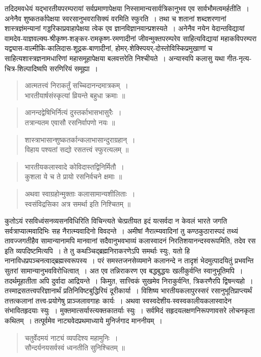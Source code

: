 {\dev तदिदमवधेयं यद्भारतीयपरम्परायां सर्वप्रमाणापेक्षया निस्सामान्यसार्वत्रिकानुभव एव सार्व\-भौमत्वमर्हतीति~। अनेनैव शुष्कतर्कापेक्षया स्वरसानुभवरासिक्यं वरमिति स्फुरति~। तथा च शतानां शब्दशरणानां शास्त्रज्ञंमन्यानां गड्डरिकाप्रवाहापेक्षया त्वेक एव ज्ञानविज्ञानवान्प्रश\-स्यते~। अनेनैव नयेन वेदान्तविद्यायां  वामदेव-याज्ञवल्क्य-श्रीकृष्ण-शङ्कर-रामकृष्ण-रमणा\-दीनां जीवन्मुक्तपरम्परेव साहित्यविद्यायां महाकविपरम्परा यद्व्यास-वाल्मीकि-कालिदास-शूद्रक-बाणादीनां, होमर्-शेक्स्पियर्-दोस्तोविस्किप्रमुखाणां च साहित्यशास्त्रज्ञनामधारिणां महासमूहापेक्षया बलवत्तरेति निश्चीयते~। अन्यास्वपि कलासु यथा गीत-नृत्य-चित्र-शिल्पादिष्वपि सरणिरियं समूह्या~।}
\begin{quote}
{\dev आत्मतत्त्वं निराकर्तुं सच्चिदानन्दमात्रकम्~।}\\
{\dev भारतीयार्षसंस्कृत्यां व्रियन्ते बहुधा क्रमाः ॥}
\end{quote}
\begin{quote}
{\dev आनन्दद्वेषिभिर्नित्यं दुस्तर्काभासभासुरैः~।}\\
{\dev तत्रान्यतम एवासौ रसनिर्वापणो नयः ॥}
\end{quote}
\begin{quote}
{\dev शास्त्राभासान्शुष्कतर्कान्कलाभासान्दुराग्रहान्~।}\\
{\dev विहाय पश्यतां सद्यो रसतत्त्वं स्फुरत्यलम् ॥}
\end{quote}
\begin{quote}
{\dev भारतीयकलास्वादे कोविदास्तद्विनिर्मितौ~।}\\
{\dev कुशला ये च ते प्रायो रसनिर्वचने क्षमाः ॥}
\end{quote}
\begin{quote}
{\dev अथवा स्वाग्रहोन्मुक्ताः कलासामान्यशीलिताः~।}\\
{\dev स्वसंविद्रसिका अत्र समर्था इति निश्चितम् ॥}
\end{quote}

{\dev कुतोऽयं रसविध्वंसनव्यसनविधिरिति विचिन्त्यते चेत्प्रतीयत इदं यत्सर्वदा न केवलं भारते जगति सर्वत्राप्यात्मवादिभिः सह नैरात्म्यवादिनो विवदन्ते~। अमीषां नैरात्म्यवादिनां तु कण्ठ\-कुठारास्पदं तथ्यं तावज्जगतीहैव सामान्यानामपि मानवानां सदैवानुभवभाव्यं कला\-स्वादनं निरतिशयानन्दस्वरूपमिति, तदेव रस इति व्यपदिष्टमित्यपि~। ते तु कथञ्चिद्ब्रह्मनिरा\-करणेऽपि समर्थाः स्युः, यतो हि नानाविधप्रपञ्चनत्वाद्ब्रह्मस्वरूपस्य~। परं समस्तजनसेव्यमाने कलानन्दे न तादृशं भेदमुत्पादयितुं प्रभवन्ति सुतरां सामान्यानुभवविरोधित्वात्~। अत एव तन्निराकरण एव बद्धबुद्धयः खलीकुर्वन्ति स्वानुभूतिमपि~। तदर्थमूहातीता अपि दुर्वादा आद्रियन्ते~। किमुत, सात्त्विकं सुखमेव निराकुर्वन्ति, त्रिकरणैरपि द्विषन्त्यहो~। तस्माद्रसतत्त्वपरिज्ञानार्थं  प्रतिनिविष्टबुद्धिरियं दूरीकार्या~। विशिष्य भारतीयकलापुरस्सरं रसानुभूतिप्राप्त्यर्थं तत्तत्कलानां तत्त्व-प्रयोगेषु प्राञ्जलावगाहः कार्यः~। अथवा स्वस्वदेशीय-स्वस्वकालीयकलास्वादेन संभा\-वितहृदयाः स्युः~। मुक्तमात्सर्यास्त्यक्तकातर्याः स्युः~। सर्वमिदं सहृदयलक्षणनिरूपणावसरे लोचनकृता कथितम्~। तत्पूर्वमेव नाट्यवेदप्रथमाध्याये मुनिर्जगाद माननीयम्~।}   
\begin{quote}
{\dev चतुर्वेदमयं नाट्यं व्यपदिश्य महामुनिः~।}\\
{\dev सौन्दर्यनयसर्वस्वं ध्वनतीति सुनिश्चितम् ॥}
\end{quote}

